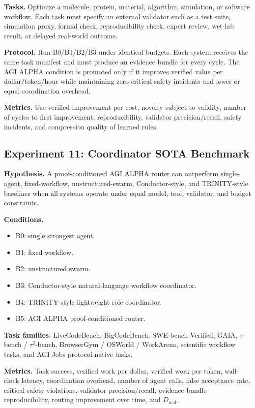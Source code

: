 \textbf{Tasks.} Optimize a molecule, protein, material, algorithm,
simulation, or software workflow. Each task must specify an external
validator such as a test suite, simulation proxy, formal check,
reproducibility check, expert review, wet-lab result, or delayed
real-world outcome.

\textbf{Protocol.} Run B0/B1/B2/B3 under identical budgets. Each system
receives the same task manifest and must produce an evidence bundle for
every cycle. The AGI ALPHA condition is promoted only if it improves
verified value per dollar/token/hour while maintaining zero critical
safety incidents and lower or equal coordination overhead.

\textbf{Metrics.} Use verified improvement per cost, novelty subject to
validity, number of cycles to first improvement, reproducibility,
validator precision/recall, safety incidents, and compression quality of
learned rules.

\subsection{Experiment 11: Coordinator SOTA
Benchmark}\label{experiment-11-coordinator-sota-benchmark}

\textbf{Hypothesis.} A proof-conditioned AGI ALPHA router can outperform
single-agent, fixed-workflow, unstructured-swarm, Conductor-style, and
TRINITY-style baselines when all systems operate under equal model,
tool, validator, and budget constraints.

\textbf{Conditions.}

\begin{itemize}
\tightlist
\item
  B0: single strongest agent.
\item
  B1: fixed workflow.
\item
  B2: unstructured swarm.
\item
  B3: Conductor-style natural-language workflow coordinator.
\item
  B4: TRINITY-style lightweight role coordinator.
\item
  B5: AGI ALPHA proof-conditioned router.
\end{itemize}

\textbf{Task families.} LiveCodeBench, BigCodeBench, SWE-bench Verified,
GAIA, \(\tau\)-bench / \(\tau^2\)-bench, BrowserGym / OSWorld /
WorkArena, scientific workflow tasks, and AGI Jobs protocol-native
tasks.

\textbf{Metrics.} Task success, verified work per dollar, verified work
per token, wall-clock latency, coordination overhead, number of agent
calls, false acceptance rate, critical safety violations, validator
precision/recall, evidence-bundle reproducibility, routing improvement
over time, and \(D_{\mathrm{real}}\).

